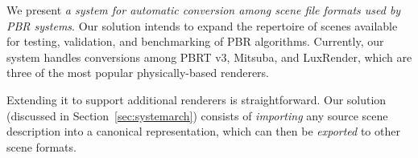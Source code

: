 
We present {\it a system for automatic conversion among scene file formats used by PBR systems}. Our solution intends to expand the repertoire of scenes available for testing, validation, and benchmarking of PBR algorithms. Currently, our system handles conversions among PBRT v3, Mitsuba, and LuxRender, which are three of the most popular physically-based renderers. 

Extending it to support additional renderers is straightforward. Our solution (discussed in Section~\ref{sec:systemarch}) consists of {\it importing} any source scene description into a canonical representation, which can then be {\it exported} to 
other scene formats. 

